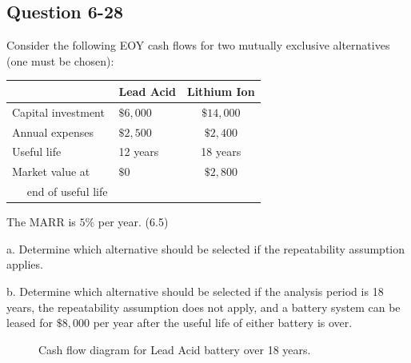 \documentclass[12pt]{article}
\begin{document}
\subsection*{Question 6-28}
\begin{q}
Consider the following EOY cash flows for two mutually exclusive alternatives (one must be chosen):
\begin{center}
\begin{tabular}{llc}
\hline & Lead Acid & Lithium Ion \\
\hline Capital investment & \(\$ 6,000\) & \(\$ 14,000\) \\
Annual expenses & \(\$ 2,500\) & \(\$ 2,400\) \\
Useful life & 12 years & 18 years \\
Market value at & \(\$ 0\) & \(\$ 2,800\) \\
\(\quad\) end of useful life & & \\
\hline
\end{tabular}
\end{center}
The MARR is \(5 \%\) per year. (6.5)

a. Determine which alternative should be selected if the repeatability assumption applies.

b. Determine which alternative should be selected if the analysis period is 18 years, the repeatability assumption does not apply, and a battery system can be leased for \(\$ 8,000\) per year after the useful life of either battery is over.
\end{q}


\begin{figure}[!ht]
    \centering
    \caption{Cash flow diagram for Lead Acid battery over 18 years.}
    \label{fig:lead-acid-battery-cash-flow}
\end{figure}
\end{document}

